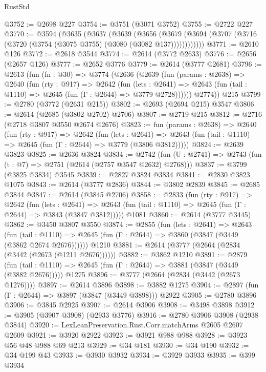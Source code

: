 \begin{lexlean}{RustStd}
\begin{coremodule}
@3752 := @2698 @227
@3754 := @3751 (@3071 @3752)
@3755 := @2722 @227
@3770 := @3594
    (@3635
      (@3637
        (@3639
          (@3656
            (@3679 (@3694 (@3707 (@3716 (@3720 (@3754 (@3075 @3755) (@3080 (@3082 @137))))))))))))
@3771 := @2610 @126
@3772 := @2618 @3544
@3774 := @2614 (@3772 @2633)
@3776 := @2656 (@2657 @126)
@3777 := @2652 @3776
@3779 := @2614 (@3777 @2681)
@3796 := @2613
    (fun (fn : @30) =>
    @3774
      (@2636
        (@2639
          (fun (params : @2638) =>
          @2640
            (fun (rty : @917) =>
            @2642
              (fun (lets : @2641) =>
              @2643 (fun (tail : @1110) => @2645 (fun (Γ : @2644) => @3779 @2728))))))
        @2774))
    @215
@3799 := @2780 (@3772 (@2631 @215))
@3802 := @2693 (@2694 @215) @3547
@3806 := @2614 (@2685 (@3802 @2702) @2706)
@3807 := @2719 @215
@3812 := @2716 (@2718 @3807 @3550 @2674 @2676)
@3823 := fun (params : @2638) =>
  @2640
    (fun (rty : @917) =>
    @2642
      (fun (lets : @2641) =>
      @2643 (fun (tail : @1110) => @2645 (fun (Γ : @2644) => @3779 (@3806 @3812)))))
@3824 := @2639 @3823
@3825 := @2636 @3824
@3834 := @2742 (fun (U : @2741) => @2743 (fun (t : @7) => @2751 (@2614 (@2757 @3547 @2632) @2768)))
@3837 := @3799 (@3825 @3834) @3545
@3839 := @2827 @3824 @3834
@3841 := @2830 @3823 @1075
@3843 := @2614 (@3777 @2836)
@3844 := @3802 @2839
@3845 := @2685 @3844
@3847 := @2614 (@3845 @2706)
@3858 := @2833
    (fun (rty : @917) =>
    @2642
      (fun (lets : @2641) =>
      @2643 (fun (tail : @1110) => @2645 (fun (Γ : @2644) => @3843 (@3847 @3812)))))
    @1081
@3860 := @2614 (@3777 @3445)
@3862 := @3450 @3807 @3550
@3874 := @2855
    (fun (lets : @2641) =>
    @2643
      (fun (tail : @1110) => @2645 (fun (Γ : @2644) => @3860 (@3847 (@3449 (@3862 @2674 @2676))))))
    @1210
@3881 := @2614 (@3777 (@2664 (@2834 (@3442 (@2673 (@1211 @2676))))))
@3882 := @3862 @1210
@3891 := @2879
    (fun (tail : @1110) => @2645 (fun (Γ : @2644) => @3881 (@3847 (@3449 (@3882 @2676)))))
    @1275
@3896 := @3777 (@2664 (@2834 (@3442 (@2673 @1276))))
@3897 := @2614 @3896
@3898 := @3882 @1275
@3904 := @2897 (fun (Γ : @2644) => @3897 (@3847 (@3449 @3898))) @2922
@3905 := @2780 @3896
@3906 := @3845 @2925
@3907 := @2614 @3906
@3908 := @3498 @3898
@3912 := @3905 (@3907 @3908) (@2933 @3776)
@3916 := @2780 @3906 @3908 (@2938 @3844)
@3920 := LexLeanPreservation.Rust.Corr.matchArms @2605 @2607 @2609
@3921 := @3920 @2922
@3923 := @3921 @988 @988
@3928 := @3923 @56 @48 @988 @69 @213
@3929 := @34 @181
@3930 := @34 @190
@3932 := @34 @199 @43
@3933 := @3930 @3932
@3934 := @3929 @3933
@3935 := @399 @3934

\end{coremodule}
\end{lexlean}
